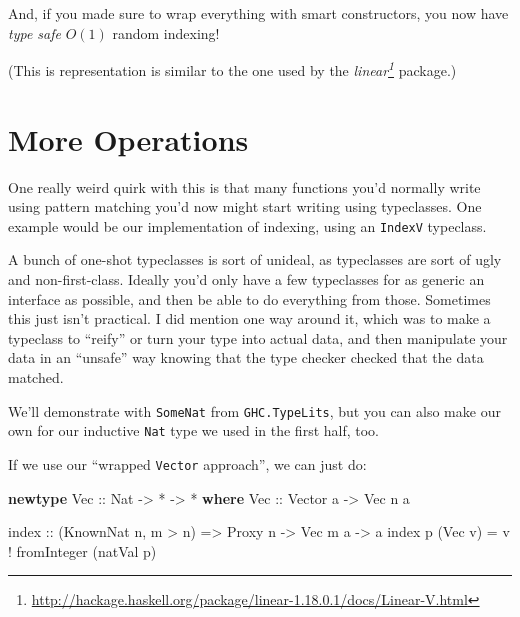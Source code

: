 \documentclass[]{article}
\newenvironment{Shaded}{}{}
\newcommand{\KeywordTok}[1]{\textcolor[rgb]{0.00,0.44,0.13}{\textbf{{#1}}}}
\newcommand{\DataTypeTok}[1]{\textcolor[rgb]{0.56,0.13,0.00}{{#1}}}
\newcommand{\OtherTok}[1]{\textcolor[rgb]{0.00,0.44,0.13}{{#1}}}
\newcommand{\FunctionTok}[1]{\textcolor[rgb]{0.02,0.16,0.49}{{#1}}}
\newcommand{\NormalTok}[1]{{#1}}
\renewcommand{\href}[2]{#2\footnote{\url{#1}}}
\begin{document}
And, if you made sure to wrap everything with smart constructors, you
now have \emph{type safe} \(O(1)\) random indexing!

(This is representation is similar to the one used by the
\emph{\href{http://hackage.haskell.org/package/linear-1.18.0.1/docs/Linear-V.html}{linear}}
package.)

\section{More Operations}\label{more-operations}

One really weird quirk with this is that many functions you'd normally
write using pattern matching you'd now might start writing using
typeclasses. One example would be our implementation of indexing, using
an \texttt{IndexV} typeclass.

A bunch of one-shot typeclasses is sort of unideal, as typeclasses are
sort of ugly and non-first-class. Ideally you'd only have a few
typeclasses for as generic an interface as possible, and then be able to
do everything from those. Sometimes this just isn't practical. I did
mention one way around it, which was to make a typeclass to ``reify'' or
turn your type into actual data, and then manipulate your data in an
``unsafe'' way knowing that the type checker checked that the data
matched.

We'll demonstrate with \texttt{SomeNat} from \texttt{GHC.TypeLits}, but
you can also make our own for our inductive \texttt{Nat} type we used in
the first half, too.

If we use our ``wrapped \texttt{Vector} approach'', we can just do:

\begin{Shaded}
\begin{Highlighting}[]
\KeywordTok{newtype} \DataTypeTok{Vec}\OtherTok{ ::} \DataTypeTok{Nat} \OtherTok{->} \FunctionTok{*} \OtherTok{->} \FunctionTok{*} \KeywordTok{where}
    \DataTypeTok{Vec}\OtherTok{ ::} \DataTypeTok{Vector} \NormalTok{a }\OtherTok{->} \DataTypeTok{Vec} \NormalTok{n a}

\NormalTok{index}\OtherTok{ ::} \NormalTok{(}\DataTypeTok{KnownNat} \NormalTok{n, m }\FunctionTok{>} \NormalTok{n) }\OtherTok{=>} \DataTypeTok{Proxy} \NormalTok{n }\OtherTok{->} \DataTypeTok{Vec} \NormalTok{m a }\OtherTok{->} \NormalTok{a}
\NormalTok{index p (}\DataTypeTok{Vec} \NormalTok{v) }\FunctionTok{=} \NormalTok{v }\FunctionTok{!} \NormalTok{fromInteger (natVal p)}
\end{Highlighting}
\end{Shaded}
\end{document}

